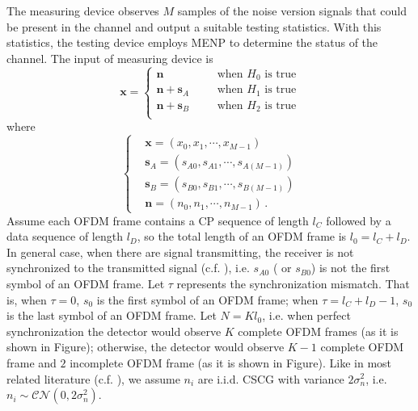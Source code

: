 The measuring device observes $M$ samples of the noise version signals that could be present in the channel and output a suitable testing statistics. With this statistics, the testing device employs MENP to determine the status of the channel. The input of measuring device is
\begin{equation}
  \mathbf{x} = \begin{cases}
	\mathbf{n}\;\;\;\;\;\;&\text{when $H_0$ is true}\\
	\mathbf{n}+\mathbf{s}_A\;\;\;\;\;\;&\text{when $H_1$ is true}\\
	\mathbf{n}+\mathbf{s}_B\;\;\;\;\;\;&\text{when $H_2$ is true}\\
  \end{cases}
  \label{equ:1209a1}
\end{equation}
where 
\begin{equation}
  \begin{cases}
	&\mathbf{x} = (x_0, x_1, \cdots, x_{M-1})\\
	&\mathbf{s}_A = (s_{A0}, s_{A1}, \cdots, s_{A(M-1)})\\
	&\mathbf{s}_B = (s_{B0}, s_{B1}, \cdots, s_{B(M-1)})\\
	&\mathbf{n} = (n_{0}, n_{1}, \cdots, n_{M-1})\,.
  \end{cases}
  \label{xssn}
\end{equation}
Assume each OFDM frame contains a CP sequence of length $l_C$ followed by a data sequence of length $l_D$, so the total length of an OFDM frame is $l_0 = l_C+l_D$. In general case, when there are signal transmitting, the receiver is not synchronized to the transmitted signal (c.f. ), i.e. $s_{A0}$ ( or $s_{B0}$) is not the first symbol of an OFDM frame. Let $\tau$ represents the synchronization mismatch. That is, when $\tau = 0$, $s_0$ is the first symbol of an OFDM frame; when $\tau = l_C+l_D -1$, $s_0$ is the last symbol of an OFDM frame. Let $N = Kl_0$, i.e. when perfect synchronization the detector would observe $K$ complete  OFDM frames (as it is shown in Figure); otherwise, the detector would observe $K-1$ complete OFDM frame and $2$ incomplete OFDM frame (as it is shown in Figure). Like in most related literature (c.f. ), we assume  $n_i$ are i.i.d. CSCG with variance $2\sigma_n^2$, i.e. $n_i \sim \mathcal{CN}(0, 2\sigma_n^2)$. 


